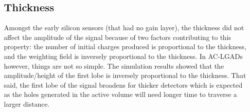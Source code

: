 \documentclass[11pt]{article}
\begin{document}
\subsection{Thickness}
Amongst the early silicon sensors (that had no gain layer), the thickness did not affect the amplitude of the signal because of two factors contributing to this property: the number of initial charges produced is proportional to the thickness, and the weighting field is inversely proportional to the thickness. In AC-LGADs however, things are not so simple. The simulation results showed that the amplitude/height of the first lobe is inversely proportional to the thickness. That said, the first lobe of the signal broadens for thicker detectors which is expected as the holes generated in the active volume will need longer time to traverse a larger distance.
\end{document}
